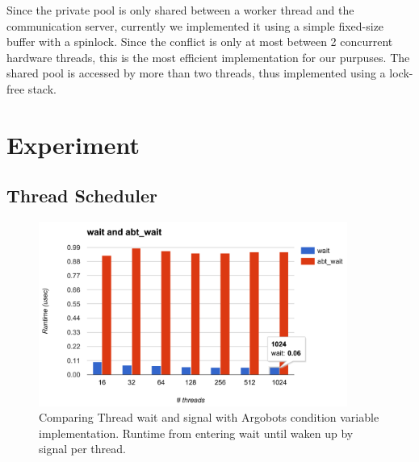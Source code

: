 \documentclass[11pt]{article}
\begin{document}
Since the private pool is only shared between a worker thread and the
communication server, currently we implemented it using a simple fixed-size
buffer with a spinlock. Since the conflict is only at most between 2 concurrent
hardware threads, this is the most efficient implementation for our purpuses.
The shared pool is accessed by more than two threads, thus implemented using a
lock-free stack.

\section{Experiment}
\subsection{Thread Scheduler}
\begin{figure}[h]
  \centering 
  \includegraphics[width=0.9\textwidth]{fig/thread.png}
  \caption{Comparing Thread wait and signal with Argobots condition variable
  implementation. Runtime from entering wait until waken up by signal per thread.}

\end{figure}

\newpage
\end{document}
